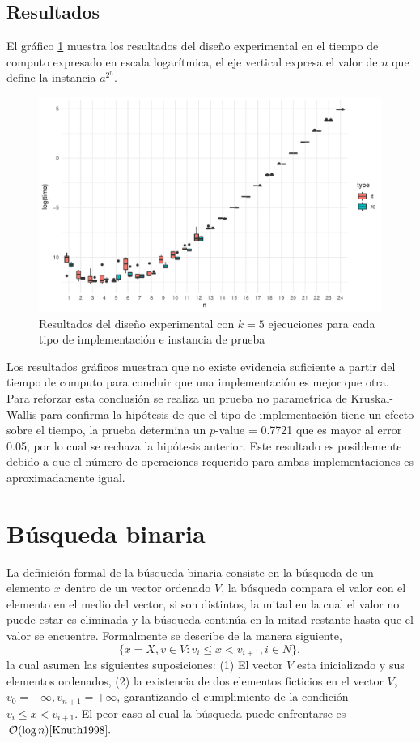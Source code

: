 \documentclass[letterpaper,11pt]{article}
\begin{document}
\subsection{Resultados}
El gráfico \ref{fig:ie} muestra los resultados del diseño experimental en el tiempo de computo expresado en escala logarítmica, el eje vertical expresa el valor de $n$ que define la instancia $a^{2^n}$.

\begin{figure}[h!]
  \includegraphics[width=\linewidth]{ie.pdf}
  \caption{Resultados del diseño experimental con $k=5$ ejecuciones para cada tipo de implementación e instancia de prueba}
  \label{fig:ie}
\end{figure}

Los resultados gráficos muestran que no existe evidencia suficiente a partir del tiempo de computo para concluir que una implementación es mejor que otra. Para reforzar esta conclusión se realiza un prueba no parametrica de Kruskal-Wallis para confirma la hipótesis de que el tipo de implementación tiene un efecto sobre el tiempo, la prueba determina un $p$-value = 0.7721 que es mayor al error 0.05, por lo cual se rechaza la hipótesis anterior. Este resultado es posiblemente debido a que el número de operaciones requerido para ambas implementaciones es aproximadamente igual.

\section{Búsqueda binaria}

La definición formal de la búsqueda binaria consiste en la búsqueda de un elemento $x$ dentro de un vector ordenado $V$,  la búsqueda compara el valor con el elemento en el medio del vector, si son distintos, la mitad en la cual el valor no puede estar es eliminada y la búsqueda continúa en la mitad restante hasta que el valor se encuentre. Formalmente se describe de la manera siguiente,
\begin{equation}
\{ x= X, v \in V: v_i \leq x < v_{i+1}, i\in N \}, 
\end{equation}
la cual asumen las siguientes suposiciones: (1) El vector $V$ esta inicializado y sus elementos ordenados, (2) la existencia de dos elementos ficticios en el vector $V$, $v_0=-\infty, v_{n+1}=+\infty$, garantizando el cumplimiento de la condición $v_i \leq x < v_{i+1}$. El peor caso al cual la búsqueda puede enfrentarse es $\mathcal{O}(\log{}n) \cite{Knuth1998}.$
\end{document}
